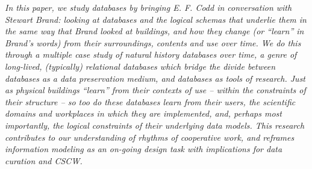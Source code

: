 \textit{In this paper, we study databases by bringing E. F. Codd in conversation with Stewart Brand: looking at databases and the logical schemas that underlie them in the same way that Brand looked at buildings, and how they change (or “learn” in Brand’s words) from their surroundings, contents and use over time.  We do this through a multiple case study of natural history databases over time, a genre of long-lived, (typically) relational databases which bridge the divide between databases as a data preservation medium, and databases as tools of research.  Just as physical buildings “learn” from their contexts of use – within the constraints of their structure – so too do these databases learn from their users, the scientific domains and workplaces in which they are implemented, and, perhaps most importantly, the logical constraints of their underlying data models.  This research contributes to our understanding of rhythms of cooperative work, and reframes information modeling as an on-going design task with implications for data curation and CSCW.}